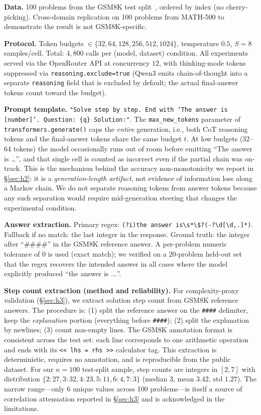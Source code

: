\documentclass{article}
\begin{document}
\textbf{Data.}  100 problems from the GSM8K test split~\citep{cobbe2021gsm8k}, ordered by index (no cherry-picking).  Cross-domain replication on 100 problems from MATH-500 to demonstrate the result is not GSM8K-specific.

\textbf{Protocol.}  Token budgets $\in \{32, 64, 128, 256, 512, 1024\}$, temperature $0.5$, $S{=}8$ samples/cell.  Total: $4{,}800$ calls per (model, dataset) condition.  All experiments served via the OpenRouter API at concurrency $12$, with thinking-mode tokens suppressed via \texttt{reasoning.exclude=true} (Qwen3 emits chain-of-thought into a separate \texttt{reasoning} field that is excluded by default; the actual final-answer tokens count toward the budget).

\textbf{Prompt template.} \texttt{"Solve step by step. End with `The answer is [number]'. Question: \{q\} Solution:"}.  The \texttt{max\_new\_tokens} parameter of \texttt{transformers.generate()} caps the \emph{entire} generation, i.e., both CoT reasoning tokens and the final-answer tokens share the same budget $t$.  At low budgets (32--64 tokens) the model occasionally runs out of room before emitting ``The answer is \ldots'', and that single cell is counted as incorrect even if the partial chain was on-track.  This is the mechanism behind the accuracy non-monotonicity we report in \S\ref{sec:h2}: it is a \emph{generation-length artifact}, not evidence of information loss along a Markov chain.  We do not separate reasoning tokens from answer tokens because any such separation would require mid-generation steering that changes the experimental condition.

\textbf{Answer extraction.}  Primary regex: \texttt{(?i)the answer is\textbackslash s*\textbackslash\$?(-?\textbackslash d[\textbackslash d,.]*)}.  Fallback if no match: the last integer in the response.  Ground truth: the integer after ``\#\#\#\#'' in the GSM8K reference answer.  A per-problem numeric tolerance of $0$ is used (exact match); we verified on a 20-problem held-out set that the regex recovers the intended answer in all cases where the model explicitly produced ``the answer is $\ldots$''.

\textbf{Step count extraction (method and reliability).}  For complexity-proxy validation (\S\ref{sec:h3}), we extract solution step count from GSM8K reference answers.  The procedure is: (1) split the reference answer on the \texttt{\#\#\#\#} delimiter, keep the \emph{explanation} portion (everything before \texttt{\#\#\#\#}); (2) split the explanation by newlines; (3) count non-empty lines.  The GSM8K annotation format is consistent across the test set: each line corresponds to one arithmetic operation and ends with its \texttt{<<\,lhs\,=\,rhs\,>>} calculator tag.  This extraction is deterministic, requires no annotation, and is reproducible from the public dataset.  For our $n{=}100$ test-split sample, step counts are integers in $[2, 7]$ with distribution $\{2{:}27, 3{:}32, 4{:}23, 5{:}11, 6{:}4, 7{:}3\}$ (median $3$, mean $3.42$, std $1.27$).  The narrow range---only 6 unique values across 100 problems---is itself a source of correlation attenuation reported in \S\ref{sec:h3} and is acknowledged in the limitations.
\end{document}
